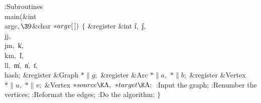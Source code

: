 :Subroutines\X\7
\\{main}(\&{int} \\{argc}${},\39{}$\&{char} ${}{*}\\{argv}[\,]){}$\1\1\2\2\6
${}\{{}$\1\6
\&{register} \&{int} \|i${},{}$ \|j${},{}$ \\{jj}${},{}$ \\{jm}${},{}$ %
\|k${},{}$ \\{km}${},{}$ \|l${},{}$ \\{ll}${},{}$ \|m${},{}$ \|n${},{}$ %
\|t${},{}$ \\{hash};\6
\&{register} \&{Graph} ${}{*}\|g;{}$\6
\&{register} \&{Arc} ${}{*}\|a,{}$ ${}{*}\|b;{}$\6
\&{register} \&{Vertex} ${}{*}\|u,{}$ ${}{*}\|v;{}$\6
\&{Vertex} ${}{*}\\{source}\K\NULL,{}$ ${}{*}\\{target}\K\NULL;{}$\7
:Input the graph\X;\6
:Renumber the vertices\X;\6
:Reformat the edges\X;\6
:Do the algorithm\X;\6
\4${}\}{}$\2\par
\fi

